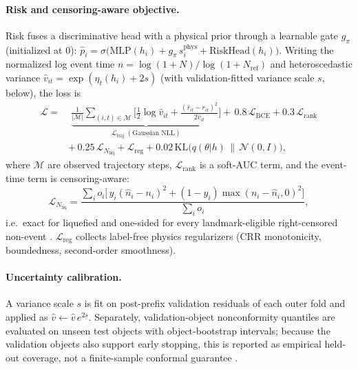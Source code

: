 \documentclass[letterpaper]{article} %
\begin{document}
\paragraph{Risk and censoring-aware objective.} Risk fuses a discriminative head with a physical prior
through a learnable gate $g_\pi$ (initialized at $0$): $\hat p_i=\sigma\!\big(\mathrm{MLP}(h_i)+g_\pi\,
s^{\mathrm{phys}}_i+\mathrm{RiskHead}(h_i)\big)$. Writing the normalized log event time
$n=\log(1{+}N)/\log(1{+}N_{\mathrm{ref}})$ and heteroscedastic variance $\hat v_{it}=\exp(\eta_t(h_i)+2s)$
(with validation-fitted variance scale $s$, below), the loss is
\begin{align}
\mathcal{L}=&\;\underbrace{\tfrac{1}{|\mathcal{M}|}\!\!\sum_{(i,t)\in\mathcal{M}}\!\!
\Big[\tfrac12\log\hat v_{it}+\tfrac{(\hat r_{it}-r_{it})^2}{2\hat v_{it}}\Big]}_{\mathcal{L}_{\mathrm{traj}}\;(\text{Gaussian NLL})}
+\,0.8\,\mathcal{L}_{\mathrm{BCE}}+0.3\,\mathcal{L}_{\mathrm{rank}}\nonumber\\
&+\,0.25\,\mathcal{L}_{N_{\mathrm{liq}}}+\mathcal{L}_{\mathrm{reg}}+0.02\,\mathrm{KL}\big(q(\theta|h)\,\|\,\mathcal{N}(0,I)\big),
\end{align}
where $\mathcal{M}$ are observed trajectory steps, $\mathcal{L}_{\mathrm{rank}}$ is a soft-AUC term, and
the event-time term is censoring-aware:
\begin{equation}
\mathcal{L}_{N_{\mathrm{liq}}}=\frac{\sum_i o_i\big[\,y_i(\hat n_i-n_i)^2+(1-y_i)\max(n_i-\hat n_i,0)^2\big]}{\sum_i o_i},
\end{equation}
i.e.\ exact for liquefied and one-sided for every landmark-eligible right-censored non-event
\citep{cox72,dsm21}. $\mathcal{L}_{\mathrm{reg}}$ collects label-free physics
regularizers (CRR monotonicity, boundedness, second-order smoothness).

\paragraph{Uncertainty calibration.} A variance scale $s$ is fit on post-prefix validation residuals of
each outer fold and applied as $\hat v\leftarrow\hat v\,e^{2s}$. Separately, validation-object
nonconformity quantiles are evaluated on unseen test objects with object-bootstrap intervals; because the
validation objects also support early stopping, this is reported as empirical held-out coverage, not a
finite-sample conformal guarantee \citep{guo17,romano19}.
\end{document}

